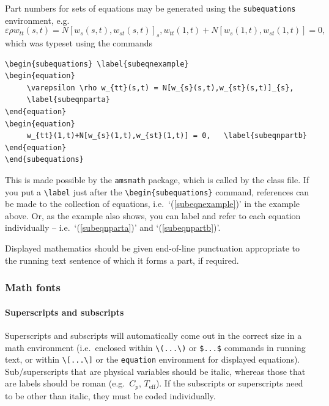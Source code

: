 \documentclass[]{interact}
\theoremstyle{plain}%
\theoremstyle{definition}
\theoremstyle{remark}
\begin{document}
Part numbers for sets of equations may be generated using the \texttt{subequations} environment, e.g.
\begin{subequations} \label{subeqnexample}
\begin{equation}
     \varepsilon \rho w_{tt}(s,t) = N[w_{s}(s,t),w_{st}(s,t)]_{s},
     \label{subeqnparta}
\end{equation}
\begin{equation}
     w_{tt}(1,t)+N[w_{s}(1,t),w_{st}(1,t)] = 0,   \label{subeqnpartb}
\end{equation}
\end{subequations}
which was typeset using the commands
\begin{verbatim}
\begin{subequations} \label{subeqnexample}
\begin{equation}
     \varepsilon \rho w_{tt}(s,t) = N[w_{s}(s,t),w_{st}(s,t)]_{s},
     \label{subeqnparta}
\end{equation}
\begin{equation}
     w_{tt}(1,t)+N[w_{s}(1,t),w_{st}(1,t)] = 0,   \label{subeqnpartb}
\end{equation}
\end{subequations}
\end{verbatim}
This is made possible by the \texttt{amsmath} package, which is called by the class file. If you put a \verb"\label" just after the \verb"\begin{subequations}" command, references can be made to the collection of equations, i.e.\ `(\ref{subeqnexample})' in the example above. Or, as the example also shows, you can label and refer to each equation individually -- i.e.\ `(\ref{subeqnparta})' and `(\ref{subeqnpartb})'.

Displayed mathematics should be given end-of-line punctuation appropriate to the running text sentence of which it forms a part, if required.

\subsubsection{Math fonts}

\paragraph{Superscripts and subscripts}
Superscripts and subscripts will automatically come out in the correct size in a math environment (i.e.\ enclosed within \verb"\(...\)" or \verb"$...$" commands in running text, or within \verb"\[...\]" or the \texttt{equation} environment for displayed equations). Sub/superscripts that are physical variables should be italic, whereas those that are labels should be roman (e.g.\ $C_p$, $T_\mathrm{eff}$). If the subscripts or superscripts need to be other than italic, they must be coded individually.
\end{document}
